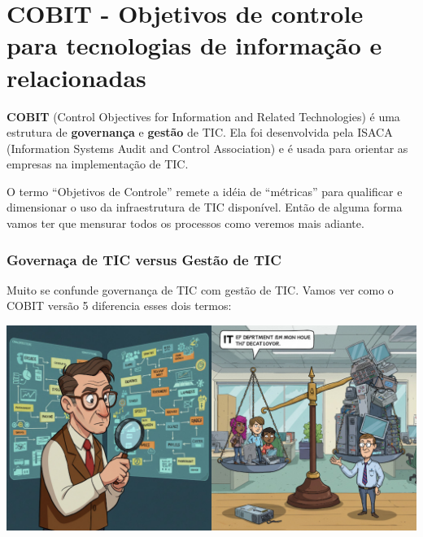 \documentclass[
]{book}
\begin{document}
\chapter{COBIT - Objetivos de controle para tecnologias de informação e relacionadas}\label{cobit---objetivos-de-controle-para-tecnologias-de-informauxe7uxe3o-e-relacionadas}

\textbf{COBIT} (Control Objectives for Information and Related Technologies) é uma estrutura de \textbf{governança} e \textbf{gestão} de TIC. Ela foi desenvolvida pela ISACA (Information Systems Audit and Control Association) e é usada para orientar as empresas na implementação de TIC.

O termo ``Objetivos de Controle'' remete a idéia de ``métricas'' para qualificar e dimensionar o uso da infraestrutura de TIC disponível. Então de alguma forma vamos ter que mensurar todos os processos como veremos mais adiante.

\subsection{Governaça de TIC versus Gestão de TIC}\label{governauxe7a-de-tic-versus-gestuxe3o-de-tic}

Muito se confunde governança de TIC com gestão de TIC. Vamos ver como o COBIT versão 5 diferencia esses dois termos:

\includegraphics[width=7.80208in,height=\textheight]{images/cobit/01-02-governanca-vs-gestao.jpg}
\end{document}

